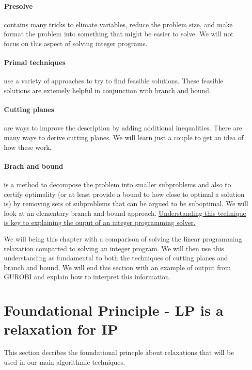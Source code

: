 \paragraph{Presolve} contains many tricks to elimate variables, reduce the problem size, and make format the problem into something that might be easier to solve.  We will not focus on this aspect of solving integer programs.

\paragraph{Primal techniques} use a variety of approaches to try to find feasible solutions.  These feasible solutions are extemely helpful in conjunction with branch and bound.

\paragraph{Cutting planes} are ways to improve the description by adding additional inequalities.  There are many ways to derive cutting planes.  We will learn just a couple to get an idea of how these work.  

\paragraph{Brach and bound} is a method to decompose the problem into smaller subproblems and also to certify optimality (or at least provide a bound to how close to optimal a solution is) by removing sets of subproblems that can be argued to be suboptimal.   We will look at an elementary branch and bound approach.  \underline{Understanding this technique is key to explaining the ouput of an integer programming solver.}


We will being this chapter with a comparison of solving the linear programming relaxation comparted to solving an integer program.  We will then use this understanding as fundamental to both the techniques of cutting planes and branch and bound.
We will end this section with an example of output from GUROBI and explain how to interpret this information.

\section{Foundational Principle - LP is a relaxation for IP}
\begin{outcome}
This section decribes the foundational princple about relaxations that will be used in our main algorithmic techniques.
\end{outcome}

